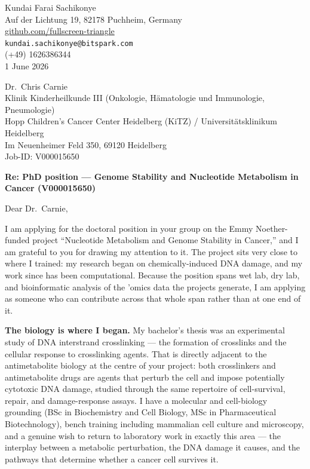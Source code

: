\documentclass[12pt,a4paper]{article}
\begin{document}
\begin{flushright}
Kundai Farai Sachikonye \\
Auf der Lichtung 19, 82178 Puchheim, Germany \\
\href{https://github.com/fullscreen-triangle}{github.com/fullscreen-triangle} \\
\texttt{kundai.sachikonye@bitspark.com} \\
(+49) 1626386344 \\[6pt]
1 June 2026
\end{flushright}

\vspace{1em}

Dr.\ Chris Carnie \\
Klinik Kinderheilkunde III (Onkologie, H\"amatologie und Immunologie, Pneumologie) \\
Hopp Children's Cancer Center Heidelberg (KiTZ) / Universit\"atsklinikum Heidelberg \\
Im Neuenheimer Feld 350, 69120 Heidelberg \\
Job-ID: V000015650

\vspace{1.5em}

\textbf{Re: PhD position --- Genome Stability and Nucleotide Metabolism in Cancer
(V000015650)}

\vspace{1em}

Dear Dr.\ Carnie,

I am applying for the doctoral position in your group on the Emmy
Noether-funded project ``Nucleotide Metabolism and Genome Stability in
Cancer,'' and I am grateful to you for drawing my attention to it. The project
sits very close to where I trained: my research began on chemically-induced DNA
damage, and my work since has been computational. Because the position spans
wet lab, dry lab, and bioinformatic analysis of the ’omics data the projects
generate, I am applying as someone who can contribute across that whole span
rather than at one end of it.

\textbf{The biology is where I began.}
My bachelor's thesis was an experimental study of DNA interstrand crosslinking
--- the formation of crosslinks and the cellular response to crosslinking
agents. That is directly adjacent to the antimetabolite biology at the centre of
your project: both crosslinkers and antimetabolite drugs are agents that perturb
the cell and impose potentially cytotoxic DNA damage, studied through the same
repertoire of cell-survival, repair, and damage-response assays. I have a
molecular and cell-biology grounding (BSc in Biochemistry and Cell Biology, MSc
in Pharmaceutical Biotechnology), bench training including mammalian cell
culture and microscopy, and a genuine wish to return to laboratory work in
exactly this area --- the interplay between a metabolic perturbation, the DNA
damage it causes, and the pathways that determine whether a cancer cell
survives it.
\end{document}
